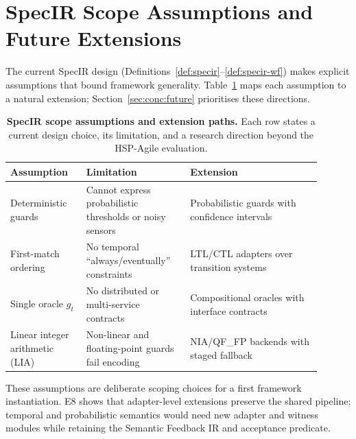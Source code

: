 \section{SpecIR Scope Assumptions and Future Extensions}
\label{sec:disc:specir-scope}

The current SpecIR design (Definitions~\ref{def:specir}--\ref{def:specir-wf})
makes explicit assumptions that bound framework generality.
Table~\ref{tab:specir-scope} maps each assumption to a natural extension;
Section~\ref{sec:conc:future} prioritises these directions.

\begin{table}[t]
  \centering
  \caption{\textbf{SpecIR scope assumptions and extension paths.}
    Each row states a current design choice, its limitation, and a research
    direction beyond the HSP-Agile evaluation.}
  \label{tab:specir-scope}
  \footnotesize
  \renewcommand{\arraystretch}{1.15}
  \begin{tabular}{@{}p{0.22\linewidth}p{0.30\linewidth}p{0.38\linewidth}@{}}
    \toprule
    \textbf{Assumption} & \textbf{Limitation} & \textbf{Extension} \\
    \midrule
    Deterministic guards &
    Cannot express probabilistic thresholds or noisy sensors &
    Probabilistic guards with confidence intervals \\
    First-match ordering &
    No temporal ``always/eventually'' constraints &
    LTL/CTL adapters over transition systems \\
    Single oracle $g_t$ &
    No distributed or multi-service contracts &
    Compositional oracles with interface contracts \\
    Linear integer arithmetic (LIA) &
    Non-linear and floating-point guards fail encoding &
    NIA/QF\_FP backends with staged fallback \\
    \bottomrule
  \end{tabular}
\end{table}

These assumptions are deliberate scoping choices for a first framework
instantiation.
E8 shows that adapter-level extensions preserve the shared pipeline; temporal
and probabilistic semantics would need new adapter and witness modules while
retaining the Semantic Feedback IR and acceptance predicate.


